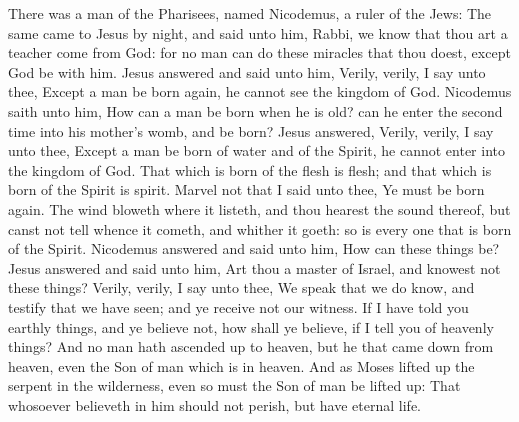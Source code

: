 
 There was a man of the Pharisees, named Nicodemus, a ruler of the Jews: The same came to Jesus by night, and said unto him, Rabbi, we know that thou art a teacher come from God: for no man can do these miracles that thou doest, except God be with him. Jesus answered and said unto him, Verily, verily, I say unto thee, Except a man be born again, he cannot see the kingdom of God. Nicodemus saith unto him, How can a man be born when he is old? can he enter the second time into his mother's womb, and be born? Jesus answered, Verily, verily, I say unto thee, Except a man be born of water and of the Spirit, he cannot enter into the kingdom of God. That which is born of the flesh is flesh; and that which is born of the Spirit is spirit. Marvel not that I said unto thee, Ye must be born again. The wind bloweth where it listeth, and thou hearest the sound thereof, but canst not tell whence it cometh, and whither it goeth: so is every one that is born of the Spirit. Nicodemus answered and said unto him, How can these things be? Jesus answered and said unto him, Art thou a master of Israel, and knowest not these things? Verily, verily, I say unto thee, We speak that we do know, and testify that we have seen; and ye receive not our witness. If I have told you earthly things, and ye believe not, how shall ye believe, if I tell you of heavenly things? And no man hath ascended up to heaven, but he that came down from heaven, even the Son of man which is in heaven. And as Moses lifted up the serpent in the wilderness, even so must the Son of man be lifted up: That whosoever believeth in him should not perish, but have eternal life.


